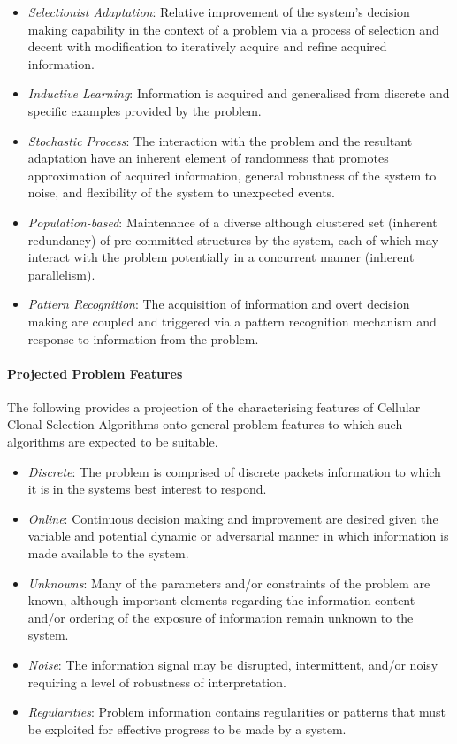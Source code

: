\begin{itemize}
	\item \emph{Selectionist Adaptation}: Relative improvement of the system's decision making capability in the context of a problem via a process of selection and decent with modification to iteratively acquire and refine acquired information.
	\item \emph{Inductive Learning}: Information is acquired and generalised from discrete and specific examples provided by the problem.
	\item \emph{Stochastic Process}: The interaction with the problem and the resultant adaptation have an inherent element of randomness that promotes approximation of acquired information, general robustness of the system to noise, and flexibility of the system to unexpected events. 
	\item \emph{Population-based}: Maintenance of a diverse although clustered set (inherent redundancy) of pre-committed structures by the system, each of which may interact with the problem potentially in a concurrent manner (inherent parallelism).	
	\item \emph{Pattern Recognition}: The acquisition of information and overt decision making are coupled and triggered via a pattern recognition mechanism and response to information from the problem.
\end{itemize}

%
%
\paragraph{Projected Problem Features}
The following provides a projection of the characterising features of Cellular Clonal Selection Algorithms onto general problem features to which such algorithms are expected to be suitable.

\begin{itemize}
	\item \emph{Discrete}: The problem is comprised of discrete packets information to which it is in the systems best interest to respond.	
	\item \emph{Online}: Continuous decision making and improvement are desired given the variable and potential dynamic or adversarial manner in which information is made available to the system.	
	\item \emph{Unknowns}: Many of the parameters and/or constraints of the problem are known, although important elements regarding the information content and/or ordering of the exposure of information remain unknown to the system.	
	\item \emph{Noise}: The information signal may be disrupted, intermittent, and/or noisy requiring a level of robustness of interpretation.	
	\item \emph{Regularities}: Problem information contains regularities or patterns that must be exploited for effective progress to be made by a system.
\end{itemize}


